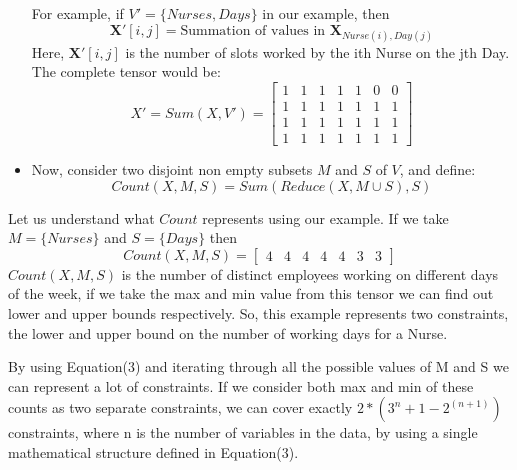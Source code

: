 \documentclass{article}
\begin{document}
\begin{itemize}
For example, if $V' = \{Nurses, Days\}$ in our example, then
\[
\textbf{X}'[i,j] = \text{Summation of values in }\textbf{X}_{Nurse(i), Day(j)}
\]
Here, $\textbf{X}'[i,j]$ is the number of slots worked by the ith Nurse on the jth Day.
The complete tensor would be:
\begin{equation}
X'
=
Sum(X, V')
=
\begin{bmatrix}
    1 & 1 & 1 & 1 & 1 & 0 & 0 \\
    1 & 1 & 1 & 1 & 1 & 1 & 1 \\
    1 & 1 & 1 & 1 & 1 & 1 & 1 \\
    1 & 1 & 1 & 1 & 1 & 1 & 1 
\end{bmatrix}
\end{equation}
\item Now, consider two disjoint non empty subsets $M$ and $S$ of $V$, and define:
\begin{equation}
Count(X,M,S)=Sum(Reduce(X, M \cup S), S)
\end{equation}
\end{itemize}
\noindent
Let us understand what $Count$ represents using our example. If we take $M=\{Nurses\}$ and $S=\{Days\}$ then 
\[
Count(X,M,S)
=
\begin{bmatrix}
    4 & 4 & 4 & 4 & 4 & 3 & 3 
\end{bmatrix} 
\]
$Count(X,M,S)$ is the number of distinct employees working on different days of the week, if we take the max and min value from this tensor we can find out lower and upper bounds respectively. So, this example represents two constraints, the lower and upper bound on the number of working days for a Nurse.

By using Equation(3) and iterating through all the possible values of M and S we can represent a lot of constraints. If we consider both max and min of these counts as two separate constraints, we can cover exactly $2*(3^n+1-2^{(n+1)})$ constraints, where n is the number of variables in the data, by using a single mathematical structure defined in Equation(3). 
\end{document}
